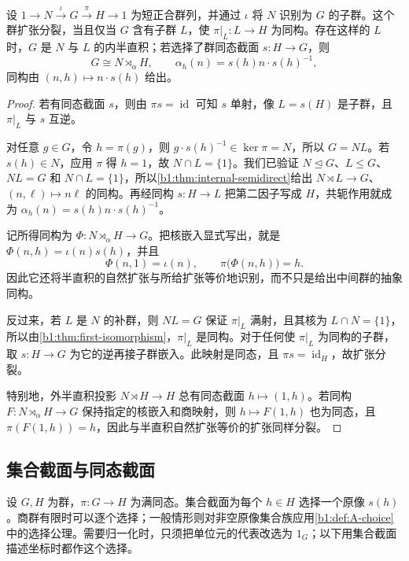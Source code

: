 \begin{theorem}[分裂扩张与半直积]\label{b1:thm:split-extension-semidirect}
	设 \(1\rightarrow N\xrightarrow{\iota}G\xrightarrow{\pi}H\rightarrow1\) 为短正合群列，并通过 \(\iota\) 将 \(N\) 识别为 \(G\) 的子群。这个群扩张分裂，当且仅当 \(G\) 含有子群 \(L\)，使 \(\pi|_L:L\rightarrow H\) 为同构。存在这样的 \(L\) 时，\(G\) 是 \(N\) 与 \(L\) 的内半直积；若选择了群同态截面 \(s:H\rightarrow G\)，则
	\[
		G\cong N\rtimes_\alpha H,\qquad \alpha_h(n)=s(h)n\cdot s(h)^{-1},
	\]
	同构由 \((n,h)\mapsto n\cdot s(h)\) 给出。
\end{theorem}
\begin{proof}
	若有同态截面 \(s\)，则由 \(\pi s=\operatorname{id}\) 可知 \(s\) 单射，像 \(L=s(H)\) 是子群，且 \(\pi|_L\) 与 \(s\) 互逆。

	对任意 \(g\in G\)，令 \(h=\pi(g)\)，则 \(g\cdot s(h)^{-1}\in\ker\pi=N\)，所以 \(G=NL\)。若 \(s(h)\in N\)，应用 \(\pi\) 得 \(h=1\)，故 \(N\cap L=\{1\}\)。我们已验证 \(N\trianglelefteq G\)、\(L\leq G\)、\(NL=G\) 和 \(N\cap L=\{1\}\)，所以\cref{b1:thm:internal-semidirect}给出 \(N\rtimes L\rightarrow G\)、\((n,\ell)\mapsto n\ell\) 的同构。再经同构 \(s:H\rightarrow L\) 把第二因子写成 \(H\)，共轭作用就成为 \(\alpha_h(n)=s(h)n\cdot s(h)^{-1}\)。

	记所得同构为 \(\Phi:N\rtimes_\alpha H\rightarrow G\)。把核嵌入显式写出，就是 \(\Phi(n,h)=\iota(n)s(h)\)，并且
	\[
		\Phi(n,1)=\iota(n),\qquad \pi\bigl(\Phi(n,h)\bigr)=h.
	\]
	因此它还将半直积的自然扩张与所给扩张等价地识别，而不只是给出中间群的抽象同构。

	反过来，若 \(L\) 是 \(N\) 的补群，则 \(NL=G\) 保证 \(\pi|_L\) 满射，且其核为 \(L\cap N=\{1\}\)，所以由\cref{b1:thm:first-isomorphism}，\(\pi|_L\) 是同构。对于任何使 \(\pi|_L\) 为同构的子群，取 \(s:H\rightarrow G\) 为它的逆再接子群嵌入。此映射是同态，且 \(\pi s=\operatorname{id}_H\)，故扩张分裂。

	特别地，外半直积投影 \(N\rtimes H\rightarrow H\) 总有同态截面 \(h\mapsto(1,h)\)。若同构 \(F:N\rtimes_\alpha H\rightarrow G\) 保持指定的核嵌入和商映射，则 \(h\mapsto F(1,h)\) 也为同态，且 \(\pi(F(1,h))=h\)，因此与半直积自然扩张等价的扩张同样分裂。
\end{proof}

\subsection{集合截面与同态截面}
\label{b1:subsec:0603:02}

设 \(G,H\) 为群，\(\pi:G\rightarrow H\) 为满同态。集合截面为每个 \(h\in H\) 选择一个原像 \(s(h)\)。商群有限时可以逐个选择；一般情形则对非空原像集合族应用\cref{b1:def:A-choice}中的选择公理。需要归一化时，只须把单位元的代表改选为 \(1_G\)；以下用集合截面描述坐标时都作这个选择。

